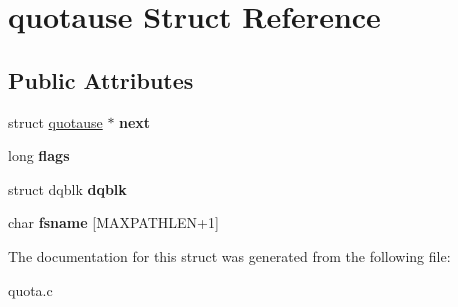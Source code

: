 \hypertarget{structquotause}{
\section{quotause Struct Reference}
\label{structquotause}
}
\subsection*{Public Attributes}
\begin{DoxyCompactItemize}
\item 
\hypertarget{structquotause_a1e21ad81b1c7fc8c04f7bd233dd10b9f}{
struct \hyperlink{structquotause}{quotause} $\ast$ {\bfseries next}}
\label{structquotause_a1e21ad81b1c7fc8c04f7bd233dd10b9f}

\item 
\hypertarget{structquotause_a524e560fbb7ac51c94d34164ba74a033}{
long {\bfseries flags}}
\label{structquotause_a524e560fbb7ac51c94d34164ba74a033}

\item 
\hypertarget{structquotause_ad7c4c532041ae1f1166680d1c06f75db}{
struct dqblk {\bfseries dqblk}}
\label{structquotause_ad7c4c532041ae1f1166680d1c06f75db}

\item 
\hypertarget{structquotause_ac269768e3a6bd6716c97686207bc232c}{
char {\bfseries fsname} \mbox{[}MAXPATHLEN+1\mbox{]}}
\label{structquotause_ac269768e3a6bd6716c97686207bc232c}

\end{DoxyCompactItemize}


The documentation for this struct was generated from the following file:\begin{DoxyCompactItemize}
\item 
quota.c\end{DoxyCompactItemize}
